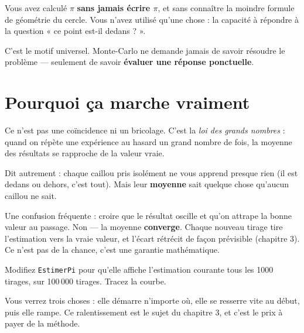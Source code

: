 \begin{nkretenir}
Vous avez calculé $\pi$ \textbf{sans jamais écrire $\pi$}, et sans connaître la
moindre formule de géométrie du cercle. Vous n'avez utilisé qu'une chose : la
capacité à répondre à la question « ce point est-il dedans ? ».

C'est le motif universel. Monte-Carlo ne demande jamais de savoir résoudre le
problème — seulement de savoir \textbf{évaluer une réponse ponctuelle}.
\end{nkretenir}

\section{Pourquoi ça marche vraiment}

Ce n'est pas une coïncidence ni un bricolage. C'est la \emph{loi des grands
nombres} : quand on répète une expérience au hasard un grand nombre de fois, la
moyenne des résultats se rapproche de la valeur vraie.

Dit autrement : chaque caillou pris isolément ne vous apprend presque rien
(il est dedans ou dehors, c'est tout). Mais leur \textbf{moyenne} sait quelque
chose qu'aucun caillou ne sait.

\begin{nkpiege}
Une confusion fréquente : croire que le résultat oscille et qu'on attrape la
bonne valeur au passage. Non — la moyenne \textbf{converge}. Chaque nouveau
tirage tire l'estimation vers la vraie valeur, et l'écart rétrécit de façon
prévisible (chapitre 3). Ce n'est pas de la chance, c'est une garantie
mathématique.
\end{nkpiege}

\begin{nkexo}
Modifiez \texttt{EstimerPi} pour qu'elle affiche l'estimation courante tous les
1000 tirages, sur 100\,000 tirages. Tracez la courbe.

Vous verrez trois choses : elle démarre n'importe où, elle se resserre vite au
début, puis elle rampe. Ce ralentissement est le sujet du chapitre 3, et c'est
le prix à payer de la méthode.
\end{nkexo}
